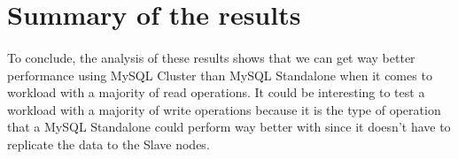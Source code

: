 \section{Summary of the results} \label{T3}

\paragraph{}To conclude, the analysis of these results shows that we can get way better performance using MySQL Cluster than MySQL Standalone when it comes to workload with a majority of read operations. It could be interesting to test a workload with a majority of write operations because it is the type of operation that a MySQL Standalone could perform way better with since it doesn't have to replicate the data to the Slave nodes.